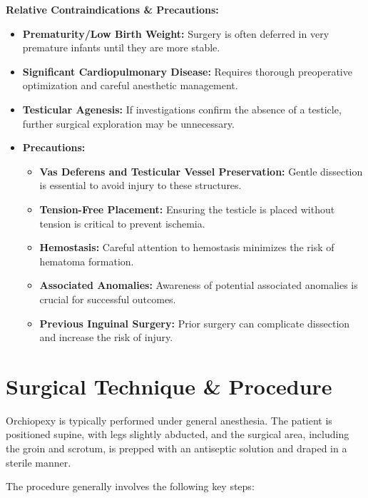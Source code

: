 \textbf{Relative Contraindications \& Precautions:}

\begin{itemize}
  \item \textbf{Prematurity/Low Birth Weight:} Surgery is often deferred in very premature infants until they are more stable.
  \item \textbf{Significant Cardiopulmonary Disease:} Requires thorough preoperative optimization and careful anesthetic management.
  \item \textbf{Testicular Agenesis:} If investigations confirm the absence of a testicle, further surgical exploration may be unnecessary.
  \item \textbf{Precautions:}
    \begin{itemize}
      \item \textbf{Vas Deferens and Testicular Vessel Preservation:} Gentle dissection is essential to avoid injury to these structures.
      \item \textbf{Tension-Free Placement:} Ensuring the testicle is placed without tension is critical to prevent ischemia.
      \item \textbf{Hemostasis:} Careful attention to hemostasis minimizes the risk of hematoma formation.
      \item \textbf{Associated Anomalies:} Awareness of potential associated anomalies is crucial for successful outcomes.
      \item \textbf{Previous Inguinal Surgery:} Prior surgery can complicate dissection and increase the risk of injury.
    \end{itemize}
\end{itemize}

\section*{Surgical Technique \& Procedure}
Orchiopexy is typically performed under general anesthesia. The patient is positioned supine, with legs slightly abducted, and the surgical area, including the groin and scrotum, is prepped with an antiseptic solution and draped in a sterile manner.

The procedure generally involves the following key steps:


